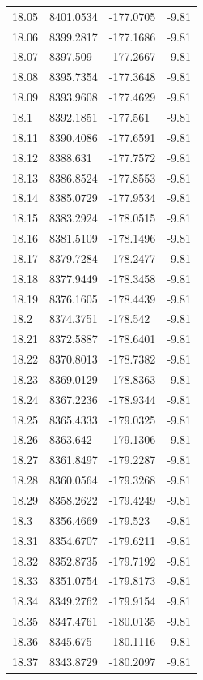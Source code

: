 \begin{table}[H]
\begin{tabular}{llll}
18.05 & 8401.0534 & -177.0705 & -9.81 \\
18.06 & 8399.2817 & -177.1686 & -9.81 \\
18.07 & 8397.509 & -177.2667 & -9.81 \\
18.08 & 8395.7354 & -177.3648 & -9.81 \\
18.09 & 8393.9608 & -177.4629 & -9.81 \\
18.1 & 8392.1851 & -177.561 & -9.81 \\
18.11 & 8390.4086 & -177.6591 & -9.81 \\
18.12 & 8388.631 & -177.7572 & -9.81 \\
18.13 & 8386.8524 & -177.8553 & -9.81 \\
18.14 & 8385.0729 & -177.9534 & -9.81 \\
18.15 & 8383.2924 & -178.0515 & -9.81 \\
18.16 & 8381.5109 & -178.1496 & -9.81 \\
18.17 & 8379.7284 & -178.2477 & -9.81 \\
18.18 & 8377.9449 & -178.3458 & -9.81 \\
18.19 & 8376.1605 & -178.4439 & -9.81 \\
18.2 & 8374.3751 & -178.542 & -9.81 \\
18.21 & 8372.5887 & -178.6401 & -9.81 \\
18.22 & 8370.8013 & -178.7382 & -9.81 \\
18.23 & 8369.0129 & -178.8363 & -9.81 \\
18.24 & 8367.2236 & -178.9344 & -9.81 \\
18.25 & 8365.4333 & -179.0325 & -9.81 \\
18.26 & 8363.642 & -179.1306 & -9.81 \\
18.27 & 8361.8497 & -179.2287 & -9.81 \\
18.28 & 8360.0564 & -179.3268 & -9.81 \\
18.29 & 8358.2622 & -179.4249 & -9.81 \\
18.3 & 8356.4669 & -179.523 & -9.81 \\
18.31 & 8354.6707 & -179.6211 & -9.81 \\
18.32 & 8352.8735 & -179.7192 & -9.81 \\
18.33 & 8351.0754 & -179.8173 & -9.81 \\
18.34 & 8349.2762 & -179.9154 & -9.81 \\
18.35 & 8347.4761 & -180.0135 & -9.81 \\
18.36 & 8345.675 & -180.1116 & -9.81 \\
18.37 & 8343.8729 & -180.2097 & -9.81 \\

\end{tabular}
\end{table}

